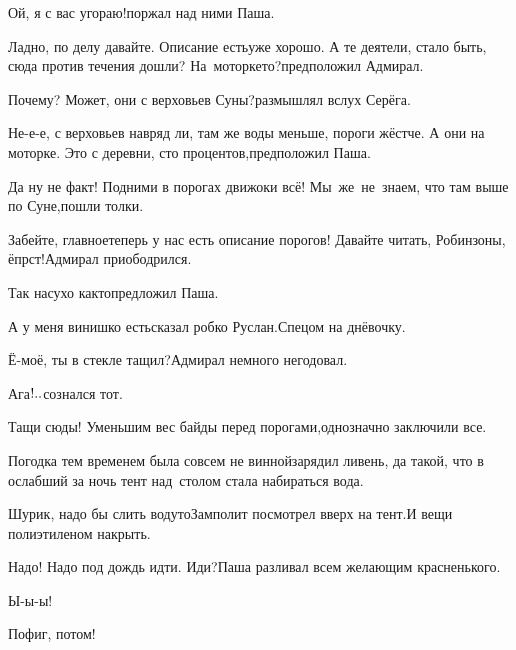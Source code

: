 \diagdash Ой, я с вас угораю!\mdash поржал над ними Паша.

\diagdash Ладно, по делу давайте. Описание есть\mdash уже хорошо. А те деятели, стало быть, сюда против течения дошли? На~моторке\sdash то?\mdash предположил Адмирал.

\diagdash Почему? Может, они с верховьев Суны?\mdash размышлял вслух Серёга.

\diagdash Не-е-е, с верховьев навряд ли, там же воды меньше, пороги жёстче. А они на моторке. Это с деревни, сто процентов,\mdash предположил Паша.%

\diagdash Да ну не факт! Подними в порогах движок\mdash и всё! Мы~же~не~знаем, что там выше по Суне,\mdash пошли толки.

\diagdash Забейте, главное\mdash теперь у нас есть описание порогов! Давайте читать, Робинзоны, ёпрст!\mdash Адмирал приободрился.

\diagdash Так насухо как\sdash то\myldots{}\mdash предложил Паша.

\diagdash А у меня винишко есть\myldots{}\mdash сказал робко Руслан.\mdash Спецом на днёвочку.

\diagdash Ё-моё, ты в стекле тащил?\mdash Адмирал немного негодовал.

\diagdash Ага$\exldots$\mdash сознался тот.


\diagdash Тащи сюды! Уменьшим вес байды перед порогами,\mdash однозначно заключили все.

Погодка тем временем была совсем не винной\mdash зарядил ливень, да такой, что в ослабший за ночь тент над~столом стала набираться вода.

\diagdash Шурик, надо бы слить воду\sdash то\myldots{}\mdash Замполит посмотрел вверх на тент.\mdash И вещи полиэтиленом накрыть.

\diagdash Надо! Надо под дождь идти. Иди?\mdash Паша разливал всем желающим красненького.


\diagdash Ы-ы-ы!

\diagdash Пофиг, потом!

